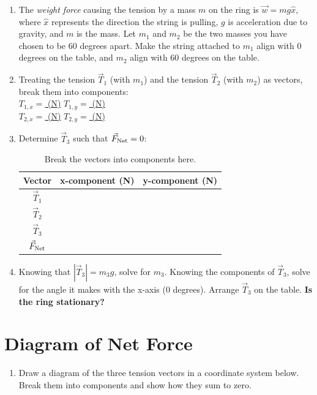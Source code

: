 \documentclass{article}
\begin{document}
\begin{enumerate}
\item The \textit{weight force} causing the tension by a mass $m$ on the ring is $\vec{w} = m g \hat{x}$, where $\hat{x}$ represents the direction the string is pulling, $g$ is acceleration due to gravity, and $m$ is the mass.  Let $m_1$ and $m_2$ be the two masses you have chosen to be 60 degrees apart.  Make the string attached to $m_1$ align with 0 degrees on the table, and $m_2$ align with 60 degrees on the table.
\item Treating the tension $\vec{T}_1$ (with $m_1$) and the tension $\vec{T}_2$ (with $m_2$) as vectors, break them into components:
\\
\underline{$T_{1,x}=$ \hspace{1cm} (N)} \hspace{0.5cm} \underline{$T_{1,y}=$ \hspace{1cm} (N)} \\ \underline{$T_{2,x}=$ \hspace{1cm} (N)} \hspace{0.5cm} \underline{$T_{2,y}=$ \hspace{1cm} (N)}
\item Determine $\vec{T}_3$ such that $\vec{F}_{\rm Net} = 0$:
\begin{table}[hb]
\centering
\begin{tabular}{| c | c | c |}
\hline
Vector & x-component (N) & y-component (N) \\ \hline
$\vec{T}_1$ & & \\ \hline
$\vec{T}_2$ & & \\ \hline
$\vec{T}_3$ & & \\ \hline
$\vec{F}_{\rm Net}$ & & \\ \hline
\end{tabular}
\caption{\label{tab:data} Break the vectors into components here.}
\end{table}
\item Knowing that $|\vec{T}_3| = m_3 g$, solve for $m_3$.  Knowing the components of $\vec{T}_3$, solve for the angle it makes with the x-axis (0 degrees).  Arrange $\vec{T}_3$ on the table.  \textbf{Is the ring stationary?} \\ \vspace{5cm}
\end{enumerate}

\section{Diagram of Net Force}

\begin{enumerate}
\item Draw a diagram of the three tension vectors in a coordinate system below.  Break them into components and show how they sum to zero.
\end{enumerate}
\end{document}

